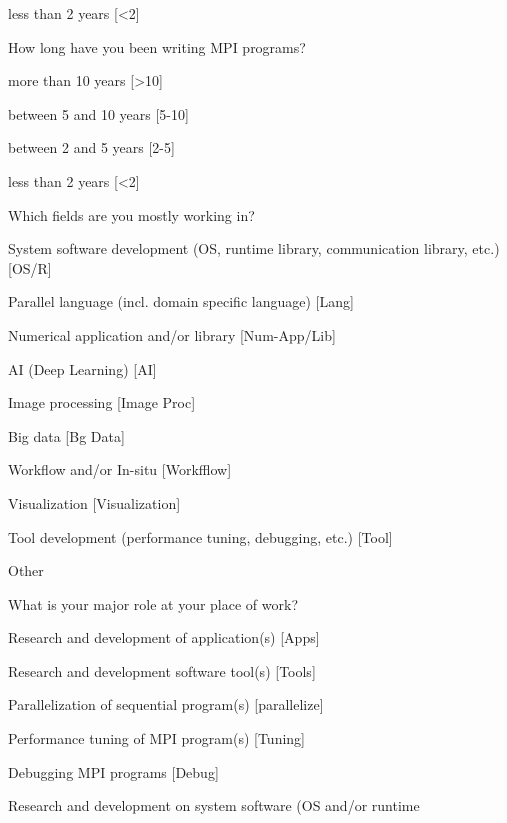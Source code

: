 \documentclass[preprint,5p,times]{elsarticle}
\begin{document}
{\begin{description}
\begin{inparaenum}[{\bf C}1)]
    \item less than 2 years [\textless 2]
    \end{inparaenum}
  \item[Q6:] How long have you been writing MPI programs?
    \begin{inparaenum}[{\bf C}1)]
    \item more than 10 years [\textgreater10]
    \item between 5 and 10 years [5-10]
    \item between 2 and 5 years [2-5]
    \item less than 2 years [\textless 2]
    \end{inparaenum}
  \item[Q7*:] Which fields are you mostly working in?
    \begin{inparaenum}[{\bf C}1)]
    \item System software development (OS, runtime library, communication
      library, etc.) [OS/R]
    \item Parallel language (incl. domain specific language) [Lang]
    \item Numerical application and/or library [Num-App/Lib]
    \item AI (Deep Learning) [AI]
    \item Image processing [Image Proc]
    \item Big data [Bg Data]
    \item Workflow and/or In-situ [Workfflow]
    \item Visualization [Visualization]
    \item Tool development (performance tuning, debugging, etc.) [Tool]
    \item Other
    \end{inparaenum}
  \item[Q8*:] What is your major role at your place of work?
    \begin{inparaenum}[{\bf C}1)]
    \item Research and development of application(s) [Apps]
    \item Research and development software tool(s) [Tools]
    \item Parallelization of sequential program(s) [parallelize]
    \item Performance tuning of MPI program(s) [Tuning]
    \item Debugging MPI programs [Debug]
    \item Research and development on system software (OS and/or runtime

\end{inparaenum}
\end{description}}
\end{document}
